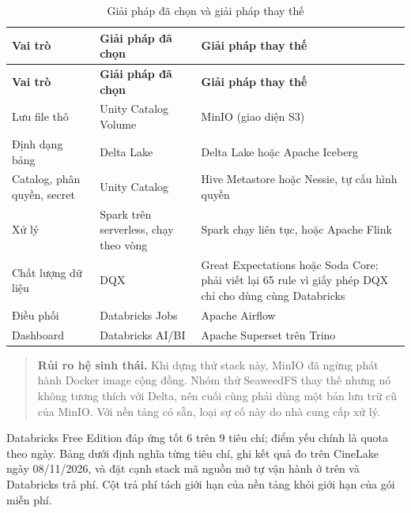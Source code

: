 \documentclass[a4paper,11pt]{article}
\newlength{\reporttablewidth}
\begin{document}
\begingroup
\small
{}
\setlength{\tabcolsep}{4pt}
\renewcommand{\arraystretch}{1.18}
\setlength{\reporttablewidth}{\dimexpr\linewidth-4\tabcolsep\relax}
\begin{longtable}{@{}L{0.20\reporttablewidth} L{0.39\reporttablewidth} L{0.41\reporttablewidth}@{}}
\caption[Giải pháp đã chọn và giải pháp thay thế (mục 5.5)]{Giải pháp đã chọn và giải pháp thay thế}\label{tab:20} \\
\toprule
\textbf{Vai trò} & \textbf{Giải pháp đã chọn} & \textbf{Giải pháp thay thế} \\
\midrule
\endfirsthead
\toprule
\textbf{Vai trò} & \textbf{Giải pháp đã chọn} & \textbf{Giải pháp thay thế} \\
\midrule
\endhead
\midrule
\endfoot
\bottomrule
\endlastfoot
Lưu file thô & Unity Catalog Volume & MinIO (giao diện S3) \\
Định dạng bảng & Delta Lake & Delta Lake hoặc Apache Iceberg \\
Catalog, phân quyền, secret & Unity Catalog & Hive Metastore hoặc Nessie, tự cấu hình quyền \\
Xử lý & Spark trên serverless, chạy theo vòng & Spark chạy liên tục, hoặc Apache Flink \\
Chất lượng dữ liệu & DQX & Great Expectations hoặc Soda Core; phải viết lại 65 rule vì giấy phép DQX chỉ cho dùng cùng Databricks \\
Điều phối & Databricks Jobs & Apache Airflow \\
Dashboard & Databricks AI/BI & Apache Superset trên Trino \\
\end{longtable}
\endgroup

\begin{quote}
\textbf{Rủi ro hệ sinh thái.} Khi dựng thử stack này, MinIO đã ngừng phát hành Docker image cộng đồng. Nhóm thử SeaweedFS thay thế nhưng nó không tương thích với Delta, nên cuối cùng phải dùng một bản lưu trữ cũ của MinIO. Với nền tảng có sẵn, loại sự cố này do nhà cung cấp xử lý.
\end{quote}

Databricks Free Edition đáp ứng tốt 6 trên 9 tiêu chí; điểm yếu chính là quota theo ngày. Bảng dưới định nghĩa từng tiêu chí, ghi kết quả đo trên CineLake ngày 08/11/2026, và đặt cạnh stack mã nguồn mở tự vận hành ở trên và Databricks trả phí. Cột trả phí tách giới hạn của nền tảng khỏi giới hạn của gói miễn phí.
\end{document}

